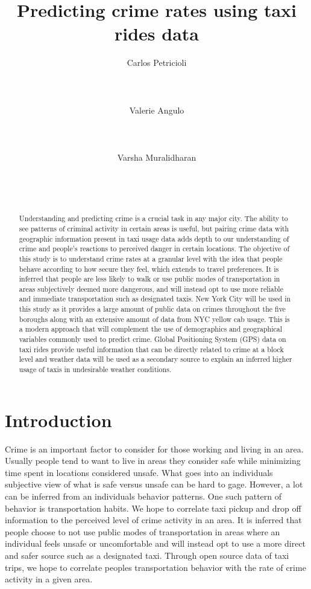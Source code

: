 \documentclass{sigkddExp}
\title{Predicting crime rates using taxi rides data}
\author{
\alignauthor Carlos Petricioli \\
       \affaddr{Computer Science Department}\\
       \affaddr{New York University}\\
       \affaddr{New York, USA}\\
       \email{petricioli@nyu.edu}
\alignauthor Valerie Angulo\\
       \affaddr{Computer Science Department}\\
       \affaddr{New York University}\\
       \affaddr{New York, USA}\\
       \email{vaa238@nyu.edu}
\alignauthor Varsha Muralidharan \\
       \affaddr{Computer Science Department}\\
       \affaddr{New York University}\\
       \affaddr{New York, USA}\\
       \email{vm1370@nyu.edu}
}
\begin{document}
\maketitle

\begin{abstract}

Understanding and predicting crime is a crucial task in any major city. The ability to see patterns of criminal activity in certain areas is useful, but pairing crime data with geographic information present in taxi usage data adds depth to our understanding of crime and people's reactions to perceived danger in certain locations. The objective of this study is to understand crime rates at a granular level with the idea that people behave according to how secure they feel, which extends to travel preferences. It is inferred that people are less likely to walk or use public modes of transportation in areas subjectively deemed more dangerous, and will instead opt to use more reliable and immediate transportation such as designated taxis. New York City will be used in this study as it provides a large amount of public data on crimes throughout the five boroughs along with an extensive amount of data from NYC yellow cab usage. This is a modern approach that will complement the use of demographics and geographical variables commonly used to predict crime. Global Positioning System (GPS) data on taxi rides provide useful information that can be directly related to crime at a block level and weather data will be used as a secondary source to explain an inferred higher usage of taxis in undesirable weather conditions. 

\end{abstract}




\section{Introduction}

Crime is an important factor to consider for those working and living in an area. Usually people tend to want to live in areas they consider safe while minimizing time spent in locations considered unsafe. What goes into an individuals subjective view of what is safe versus unsafe can be hard to gage. However, a lot can be inferred from an individuals behavior patterns. One such pattern of behavior is transportation habits. We hope to correlate taxi pickup and drop off information to the perceived level of crime activity in an area. It is inferred that people choose to not use public modes of transportation in areas where an individual feels unsafe or uncomfortable and will instead opt to use a more direct and safer source such as a designated taxi. Through open source data of taxi trips, we hope to correlate peoples transportation behavior with the rate of crime activity in a given area. 
\end{document}
